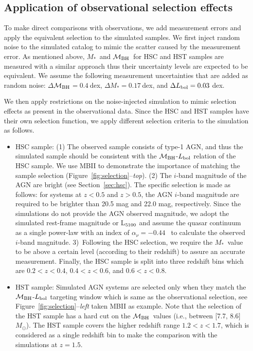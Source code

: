 \documentclass[twocolumn]{aastex631}
\def\smass{{$M_*$}}
\def\mbh{$\mathcal M_{\rm BH}$}
\begin{document}
\subsection{Application of observational selection effects}
To make direct comparisons with observations, we add measurement errors and apply the equivalent selection to the simulated samples. We first inject random noise to the simulated catalog to mimic the scatter caused by the measurement error. As mentioned above, \smass\ and \mbh\ for HSC and HST samples are measured with a similar approach thus their uncertainty levels are expected to be equivalent. 
We assume the following measurement uncertainties that are added as random noise: $\Delta$\mbh$ = 0.4~$dex, $\Delta$\smass$ = 0.17~$dex, and $\Delta L_{\rm bol} = 0.03~$dex. 

We then apply restrictions on the noise-injected simulation to mimic selection effects as present in the observational data. Since the HSC and HST samples have their own selection function, we apply different selection criteria to the simulation as follows.
\begin{itemize}

 \item{}HSC sample: (1) The observed sample consists of type-1 AGN, and thus the simulated sample should be consistent with the \mbh-$L_{\rm bol}$ relation of the HSC sample. We use MBII to demonstrate the importance of matching the sample selection (Figure~\ref{fig:selection}--{\it top}). (2) The $i$-band magnitude of the AGN are bright (see Section~\ref{sec:hsc}). The specific selection is made as follows: for systems at $z<0.5$ and $z>0.5$, the AGN $i$-band magnitude are required to be brighter than 20.5 mag and 22.0 mag, respectively. Since the simulations do not provide the AGN observed magnitude, we adopt the simulated rest-frame magnitude or L$_{\rm 5100}$ and assume the quasar continuum as a single power-law with an index of $\alpha_\nu=-0.44$~\citep{2001AJ....122..549V} to calculate the observed $i$-band magnitude.
 3)~Following the HSC selection, we require the \smass\ value to be above a certain level (according to their redshift) to assure an accurate measurement. Finally, the HSC sample is split into three redshift bins which are $0.2<z<0.4$, $0.4<z<0.6$, and $0.6<z<0.8$.
 
\item{}HST sample: Simulated AGN systems are selected only when they match the  \mbh-$L_{\rm bol}$ targeting window which is same as the observational selection, see Figure~\ref{fig:selection}--{\it left} taken MBII as example. Note that the selection of the HST sample has a hard cut on the \mbh\ values (i.e., between [7.7, 8.6] $M_{\odot}$). The HST sample covers the higher redshift range $1.2<z<1.7$, which is considered as a single redshift bin to make the comparison with the simulations at $z=1.5$.
\end{itemize}
\end{document}
